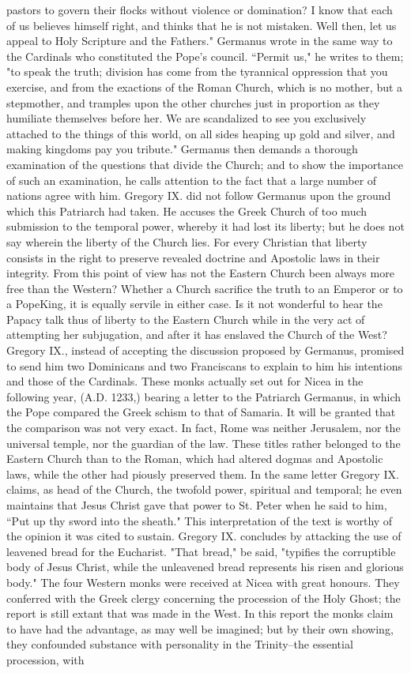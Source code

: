 pastors to govern their flocks without violence or domination? I know that each of us believes himself right, and thinks that he is not mistaken. Well then, let us appeal to Holy Scripture and the Fathers." Germanus wrote in the same way to the Cardinals who constituted the Pope's council. “Permit us," he writes to them; "to speak the truth; division has come from the tyrannical oppression that you exercise, and from the exactions of the Roman Church, which is no mother, but a stepmother, and tramples upon the other churches just in proportion as they humiliate themselves before her. We are scandalized to see you exclusively attached to the things of this world, on all sides heaping up gold and silver, and making kingdoms pay you tribute." Germanus then demands a thorough examination of the questions that divide the Church; and to show the importance of such an examination, he calls attention to the fact that a large number of nations agree with him. Gregory IX. did not follow Germanus upon the ground which this Patriarch had taken. He accuses the Greek Church of too much submission to the temporal power, whereby it had lost its liberty; but he does not say wherein the liberty of the Church lies. For every Christian that liberty consists in the right to preserve revealed doctrine and Apostolic laws in their integrity. From this point of view has not the Eastern Church been always more free than the Western? Whether a Church sacrifice the truth to an Emperor or to a PopeKing, it is equally servile in either case. Is it not wonderful to hear the Papacy talk thus of liberty to the Eastern Church while in the very act of attempting her subjugation, and after it has enslaved the Church of the West? Gregory IX., instead of accepting the discussion proposed by Germanus, promised to send him two Dominicans and two Franciscans to explain to him his intentions and those of the Cardinals. These monks actually set out for Nicea in the following year, (A.D. 1233,) bearing a letter to the Patriarch Germanus, in which the Pope compared the Greek schism to that of Samaria. It will be granted that the comparison was not very exact. In fact, Rome was neither Jerusalem, nor the universal temple, nor the guardian of the law. These titles rather belonged to the Eastern Church than to the Roman, which had altered dogmas and Apostolic laws, while the other had piously preserved them. In the same letter Gregory IX. claims, as head of the Church, the twofold power, spiritual and temporal; he even maintains that Jesus Christ gave that power to St. Peter when he said to him, “Put up thy sword into the sheath." This interpretation of the text is worthy of the opinion it was cited to sustain. Gregory IX. concludes by attacking the use of leavened bread for the Eucharist. "That bread," be said, "typifies the corruptible body of Jesus Christ, while the unleavened bread represents his risen and glorious body." The four Western monks were received at Nicea with great honours. They conferred with the Greek clergy concerning the procession of the Holy Ghost; the report is still extant that was made in the West. In this report the monks claim to have had the advantage, as may well be imagined; but by their own showing, they confounded substance with personality in the Trinity--the essential procession, with 